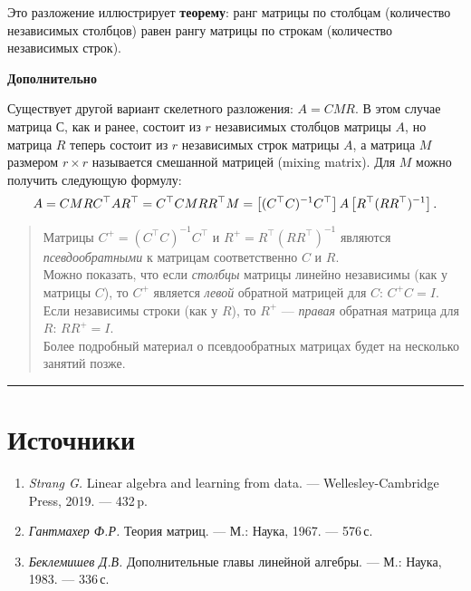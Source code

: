 \documentclass[11pt,a4paper]{article}
\renewcommand{\linethickness}{0.1ex}
\providecommand{\tightlist}{%
      \setlength{\itemsep}{0pt}\setlength{\parskip}{0pt}}
\begin{document}
Это разложение иллюстрирует \textbf{теорему}: ранг матрицы по столбцам
(количество независимых столбцов) равен рангу матрицы по строкам
(количество независимых строк).

    \textbf{Дополнительно}

Существует другой вариант скелетного разложения: \(A = CMR\). В этом
случае матрица \(С\), как и ранее, состоит из \(r\) независимых столбцов
матрицы \(A\), но матрица \(R\) теперь состоит из \(r\) независимых
строк матрицы \(A\), а матрица \(M\) размером \(r \times r\) называется
смешанной матрицей (mixing matrix). Для \(M\) можно получить следующую
формулу: \[
  A = CMR \\
  C^\top A R^\top = C^\top C M R R^\top \\
  M = \left[ (C^\top C)^{-1}C^\top \right] A \left[ R^\top (R R^\top)^{-1} \right].
\]

    \begin{quote}
Матрицы \(C^+ = (C^\top C)^{-1}C^\top\) и
\(R^+ = R^\top (R R^\top)^{-1}\) являются \emph{псевдообратными} к
матрицам соответственно \(C\) и \(R\).\\
Можно показать, что если \emph{столбцы} матрицы линейно независимы (как
у матрицы \(C\)), то \(C^+\) является \emph{левой} обратной матрицей для
\(C\): \(C^+ C = I\). Если независимы строки (как у \(R\)), то \(R^+\)
--- \emph{правая} обратная матрица для \(R\): \(R R^+ = I\).\\
Более подробный материал о псевдообратных матрицах будет на несколько
занятий позже.
\end{quote}

    \begin{center}\rule{0.5\linewidth}{\linethickness}\end{center}

    \hypertarget{ux438ux441ux442ux43eux447ux43dux438ux43aux438}{%
\section{Источники}\label{ux438ux441ux442ux43eux447ux43dux438ux43aux438}}

\begin{enumerate}
\def\labelenumi{\arabic{enumi}.}
\tightlist
\item
  \emph{Strang G.} Linear algebra and learning from data. ---
  Wellesley-Cambridge Press, 2019. --- 432\,p.
\item
  \emph{Гантмахер Ф.Р.} Теория матриц. --- М.: Наука, 1967. --- 576\,с.
\item
  \emph{Беклемишев Д.В.} Дополнительные главы линейной алгебры. --- М.:
  Наука, 1983. --- 336\,с.
\end{enumerate}


    
    
    
\end{document}
